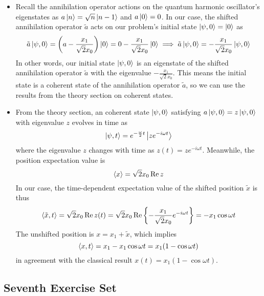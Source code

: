 \documentclass[11pt, a4paper]{article}
\begin{document}
\begin{itemize}
 	\item Recall the annihilation operator actions on the quantum harmonic oscillator's eigenstates as $ a \ket{n} = \sqrt{n} \ket{n-1} $ and $ a \ket{0} = 0 $. In our case, the shifted annihilation operator $ \tilde{a} $ acts on our problem's initial state $ \ket{\psi, 0} = \ket{0} $ as
 	\begin{equation*}
 		\tilde{a}\ket{\psi, 0} = \left(a -\frac{x_{1}}{\sqrt{2}x_{0}}\right)\ket{0} = 0 - \frac{x_{1}}{\sqrt{2}x_{0}} \ket{0} \implies \tilde{a}\ket{\psi, 0} = - \frac{x_{1}}{\sqrt{2}x_{0}} \ket{\psi, 0}
 	\end{equation*}
 	In other words, our initial state $ \ket{\psi, 0} $ is an eigenstate of the shifted annihilation operator $ \tilde{a} $ with the eigenvalue $  - \frac{x_{1}}{\sqrt{2}x_{0}} $. This means the initial state is a coherent state of the annihilation operator $ \tilde{a} $, so we can use the results from the theory section on coherent states.
 	
 	\item From the theory section, an coherent state $ \ket{\psi, 0} $ satisfying $ a \ket{\psi, 0} = z \ket{\psi, 0} $ with eigenvalue $ z $ evolves in time as
 	\begin{equation*}
		\ket{\psi, t} = e^{-\frac{\omega}{2}t}\ket{ze^{-i\omega t}}
 	\end{equation*}
	where the eigenvalue $ z $ changes with time as $ 	z(t) = ze^{-i\omega t} $. Meanwhile, the position expectation value is
	\begin{equation*}
		\ev{x} = \sqrt{2} x_{0}\Re z
	\end{equation*}
	In our case, the time-dependent expectation value of the shifted position $ \tilde{x} $ is thus
	\begin{equation*}
		\ev{\tilde{x}, t} = \sqrt{2}x_{0}\Re z(t) = \sqrt{2}x_{0}\Re \left\{- \frac{x_{1}}{\sqrt{2}x_{0}}e^{-i\omega t}\right\} = - x_{1} \cos \omega t
	\end{equation*}
	The unshifted position is $ x = x_{1} + \tilde{x} $, which implies
	\begin{equation*}
		\ev{x, t} = x_{1} - x_{1}\cos \omega t = x_{1}(1 - \cos \omega t)
	\end{equation*}
	in agreement with the classical result $ x(t) = x_{1}(1 - \cos \omega t) $. 
\end{itemize}


\subsection{Seventh Exercise Set}
\end{document}
